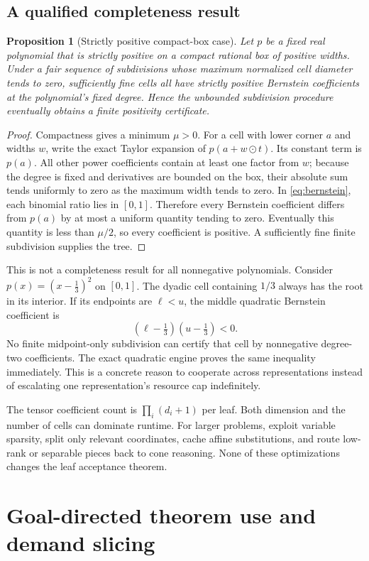 \documentclass[11pt,letterpaper]{article}
\newtheorem{proposition}{Proposition}[section]
\theoremstyle{definition}
\theoremstyle{remark}
\begin{document}
\subsection{A qualified completeness result}
\begin{proposition}[Strictly positive compact-box case]
Let $p$ be a fixed real polynomial that is strictly positive on a compact rational box of positive widths. Under a fair sequence of subdivisions whose maximum normalized cell diameter tends to zero, sufficiently fine cells all have strictly positive Bernstein coefficients at the polynomial's fixed degree. Hence the unbounded subdivision procedure eventually obtains a finite positivity certificate.
\end{proposition}
\begin{proof}
Compactness gives a minimum $\mu>0$. For a cell with lower corner $a$ and widths $w$, write the exact Taylor expansion of $p(a+w\odot t)$. Its constant term is $p(a)$. All other power coefficients contain at least one factor from $w$; because the degree is fixed and derivatives are bounded on the box, their absolute sum tends uniformly to zero as the maximum width tends to zero. In \eqref{eq:bernstein}, each binomial ratio lies in $[0,1]$. Therefore every Bernstein coefficient differs from $p(a)$ by at most a uniform quantity tending to zero. Eventually this quantity is less than $\mu/2$, so every coefficient is positive. A sufficiently fine finite subdivision supplies the tree.
\end{proof}
This is not a completeness result for all nonnegative polynomials. Consider $p(x)=(x-\tfrac13)^2$ on $[0,1]$. The dyadic cell containing $1/3$ always has the root in its interior. If its endpoints are $\ell<u$, the middle quadratic Bernstein coefficient is
\[
(\ell-\tfrac13)(u-\tfrac13)<0.
\]
No finite midpoint-only subdivision can certify that cell by nonnegative degree-two coefficients. The exact quadratic engine proves the same inequality immediately. This is a concrete reason to cooperate across representations instead of escalating one representation's resource cap indefinitely.

The tensor coefficient count is $\prod_i(d_i+1)$ per leaf. Both dimension and the number of cells can dominate runtime. For larger problems, exploit variable sparsity, split only relevant coordinates, cache affine substitutions, and route low-rank or separable pieces back to cone reasoning. None of these optimizations changes the leaf acceptance theorem.

\section{Goal-directed theorem use and demand slicing}
\end{document}
